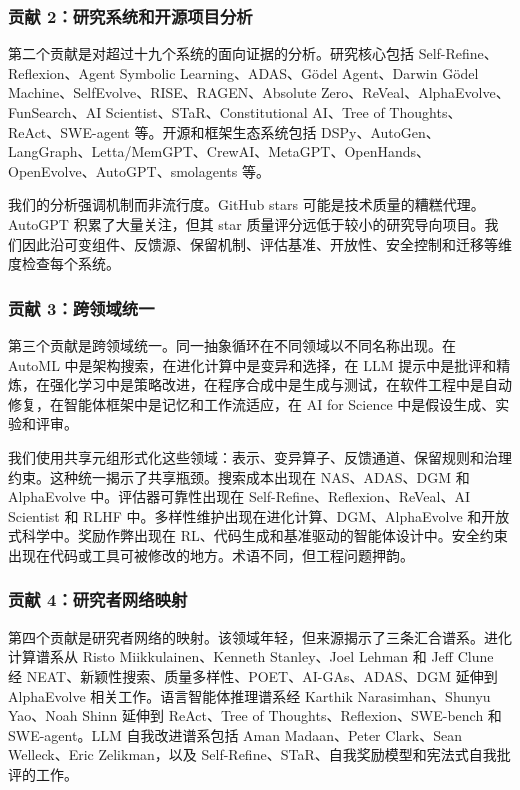 \subsubsection{贡献 2：研究系统和开源项目分析}

第二个贡献是对超过十九个系统的面向证据的分析。研究核心包括 Self-Refine、Reflexion、Agent Symbolic Learning、ADAS、G\"{o}del Agent、Darwin G\"{o}del Machine、SelfEvolve、RISE、RAGEN、Absolute Zero、ReVeal、AlphaEvolve、FunSearch、AI Scientist、STaR、Constitutional AI、Tree of Thoughts、ReAct、SWE-agent 等。开源和框架生态系统包括 DSPy、AutoGen、LangGraph、Letta/MemGPT、CrewAI、MetaGPT、OpenHands、OpenEvolve、AutoGPT、smolagents 等。

我们的分析强调机制而非流行度。GitHub stars 可能是技术质量的糟糕代理。AutoGPT 积累了大量关注，但其 star 质量评分远低于较小的研究导向项目。我们因此沿可变组件、反馈源、保留机制、评估基准、开放性、安全控制和迁移等维度检查每个系统。

\subsubsection{贡献 3：跨领域统一}

第三个贡献是跨领域统一。同一抽象循环在不同领域以不同名称出现。在 AutoML 中是架构搜索，在进化计算中是变异和选择，在 LLM 提示中是批评和精炼，在强化学习中是策略改进，在程序合成中是生成与测试，在软件工程中是自动修复，在智能体框架中是记忆和工作流适应，在 AI for Science 中是假设生成、实验和评审。

我们使用共享元组形式化这些领域：表示、变异算子、反馈通道、保留规则和治理约束。这种统一揭示了共享瓶颈。搜索成本出现在 NAS、ADAS、DGM 和 AlphaEvolve 中。评估器可靠性出现在 Self-Refine、Reflexion、ReVeal、AI Scientist 和 RLHF 中。多样性维护出现在进化计算、DGM、AlphaEvolve 和开放式科学中。奖励作弊出现在 RL、代码生成和基准驱动的智能体设计中。安全约束出现在代码或工具可被修改的地方。术语不同，但工程问题押韵。

\subsubsection{贡献 4：研究者网络映射}

第四个贡献是研究者网络的映射。该领域年轻，但来源揭示了三条汇合谱系。进化计算谱系从 Risto Miikkulainen、Kenneth Stanley、Joel Lehman 和 Jeff Clune 经 NEAT、新颖性搜索、质量多样性、POET、AI-GAs、ADAS、DGM 延伸到 AlphaEvolve 相关工作。语言智能体推理谱系经 Karthik Narasimhan、Shunyu Yao、Noah Shinn 延伸到 ReAct、Tree of Thoughts、Reflexion、SWE-bench 和 SWE-agent。LLM 自我改进谱系包括 Aman Madaan、Peter Clark、Sean Welleck、Eric Zelikman，以及 Self-Refine、STaR、自我奖励模型和宪法式自我批评的工作。

